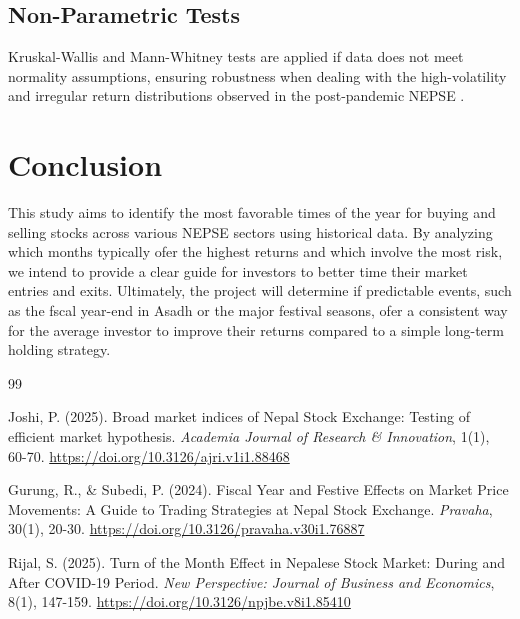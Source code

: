 \documentclass[12pt,a4paper,fleqn]{article}
\begin{document}
\subsection{Non-Parametric Tests}
Kruskal-Wallis and Mann-Whitney tests are applied if data does not meet normality assumptions, ensuring robustness when dealing with the high-volatility and irregular return distributions observed in the post-pandemic NEPSE \cite{rijal2025}.

\section{Conclusion}
This study aims to identify the most favorable times of the year for buying and selling stocks across various NEPSE sectors using historical data. By analyzing which months typically ofer the highest returns and which involve the most risk, we intend to provide a clear guide for investors to better time their market entries and exits. Ultimately, the project will determine if predictable events, such as the fscal year-end in Asadh or the major festival seasons, ofer a consistent way for the average investor to improve their returns compared to a simple long-term holding strategy.

\begin{thebibliography}{99}

Joshi, P. (2025). Broad market indices of Nepal Stock Exchange: Testing of efficient market hypothesis. \textit{Academia Journal of Research \& Innovation}, 1(1), 60-70. \url{https://doi.org/10.3126/ajri.v1i1.88468}

Gurung, R., \& Subedi, P. (2024). Fiscal Year and Festive Effects on Market Price Movements: A Guide to Trading Strategies at Nepal Stock Exchange. \textit{Pravaha}, 30(1), 20-30. \url{https://doi.org/10.3126/pravaha.v30i1.76887}

Rijal, S. (2025). Turn of the Month Effect in Nepalese Stock Market: During and After COVID-19 Period. \textit{New Perspective: Journal of Business and Economics}, 8(1), 147-159. \url{https://doi.org/10.3126/npjbe.v8i1.85410}

\end{thebibliography}
\end{document}
